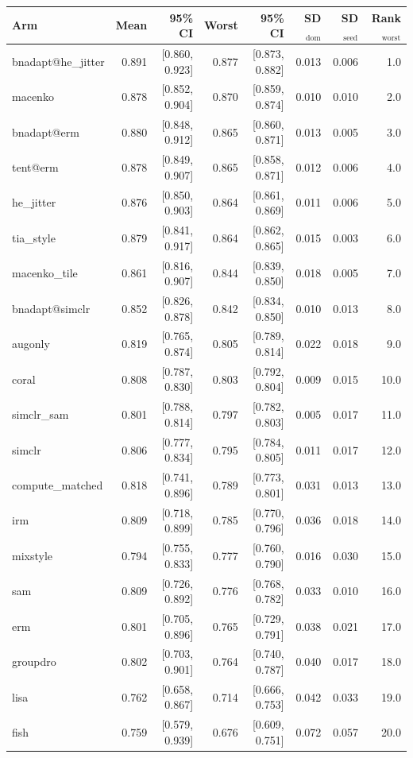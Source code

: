 \begin{tabular}{lrrrrrrr}
\toprule
Arm & Mean & 95\% CI & Worst & 95\% CI & SD$_\text{dom}$ & SD$_\text{seed}$ & Rank$_\text{worst}$ \\
\midrule
bnadapt@he\_jitter & 0.891 & [0.860, 0.923] & 0.877 & [0.873, 0.882] & 0.013 & 0.006 & 1.0 \\
macenko & 0.878 & [0.852, 0.904] & 0.870 & [0.859, 0.874] & 0.010 & 0.010 & 2.0 \\
bnadapt@erm & 0.880 & [0.848, 0.912] & 0.865 & [0.860, 0.871] & 0.013 & 0.005 & 3.0 \\
tent@erm & 0.878 & [0.849, 0.907] & 0.865 & [0.858, 0.871] & 0.012 & 0.006 & 4.0 \\
he\_jitter & 0.876 & [0.850, 0.903] & 0.864 & [0.861, 0.869] & 0.011 & 0.006 & 5.0 \\
tia\_style & 0.879 & [0.841, 0.917] & 0.864 & [0.862, 0.865] & 0.015 & 0.003 & 6.0 \\
macenko\_tile & 0.861 & [0.816, 0.907] & 0.844 & [0.839, 0.850] & 0.018 & 0.005 & 7.0 \\
bnadapt@simclr & 0.852 & [0.826, 0.878] & 0.842 & [0.834, 0.850] & 0.010 & 0.013 & 8.0 \\
augonly & 0.819 & [0.765, 0.874] & 0.805 & [0.789, 0.814] & 0.022 & 0.018 & 9.0 \\
coral & 0.808 & [0.787, 0.830] & 0.803 & [0.792, 0.804] & 0.009 & 0.015 & 10.0 \\
simclr\_sam & 0.801 & [0.788, 0.814] & 0.797 & [0.782, 0.803] & 0.005 & 0.017 & 11.0 \\
simclr & 0.806 & [0.777, 0.834] & 0.795 & [0.784, 0.805] & 0.011 & 0.017 & 12.0 \\
compute\_matched & 0.818 & [0.741, 0.896] & 0.789 & [0.773, 0.801] & 0.031 & 0.013 & 13.0 \\
irm & 0.809 & [0.718, 0.899] & 0.785 & [0.770, 0.796] & 0.036 & 0.018 & 14.0 \\
mixstyle & 0.794 & [0.755, 0.833] & 0.777 & [0.760, 0.790] & 0.016 & 0.030 & 15.0 \\
sam & 0.809 & [0.726, 0.892] & 0.776 & [0.768, 0.782] & 0.033 & 0.010 & 16.0 \\
erm & 0.801 & [0.705, 0.896] & 0.765 & [0.729, 0.791] & 0.038 & 0.021 & 17.0 \\
groupdro & 0.802 & [0.703, 0.901] & 0.764 & [0.740, 0.787] & 0.040 & 0.017 & 18.0 \\
lisa & 0.762 & [0.658, 0.867] & 0.714 & [0.666, 0.753] & 0.042 & 0.033 & 19.0 \\
fish & 0.759 & [0.579, 0.939] & 0.676 & [0.609, 0.751] & 0.072 & 0.057 & 20.0 \\
\bottomrule
\end{tabular}

